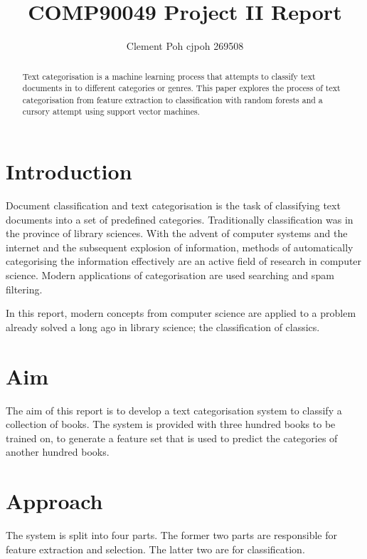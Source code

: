 \documentclass[11pt]{article}
\title{COMP90049 Project II Report}
\author{Clement Poh cjpoh 269508}
\begin{document}
\maketitle


\begin{abstract}

Text categorisation is a machine learning process that attempts to classify text
documents in to different categories or genres. This paper explores the process
of text categorisation from feature extraction to classification with random
forests and a cursory attempt using support vector machines.

\end{abstract}


\section{Introduction}

Document classification and text categorisation is the task of classifying text
documents into a set of predefined categories. Traditionally classification was
in the province of library sciences. With the advent of computer systems and the
internet and the subsequent explosion of information, methods of automatically
categorising the information effectively are an active field of research in
computer science. Modern applications of categorisation are used searching and
spam filtering.

In this report, modern concepts from computer science are applied to a problem
already solved a long ago in library science; the classification of classics.

\section{Aim}

The aim of this report is to develop a text categorisation system to classify a
collection of books. The system is provided with three hundred books to be
trained on, to generate a feature set that is used to predict the categories of
another hundred books.

\section{Approach}

The system is split into four parts. The former two parts are responsible for
feature extraction and selection. The latter two are for classification.
\end{document}
